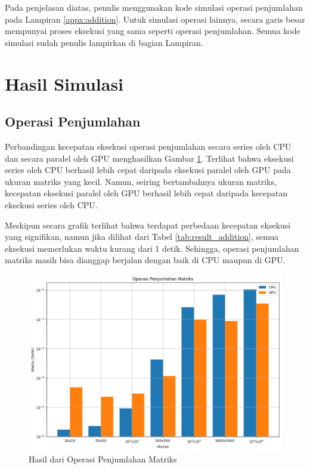 Pada penjelasan diatas, penulis menggunakan kode simulasi operasi penjumlahan pada Lampiran \ref{appx:addition}. Untuk simulasi operasi lainnya, secara garis besar mempunyai proses eksekusi yang sama seperti operasi penjumlahan. Semua kode simulasi sudah penulis lampirkan di bagian Lampiran.

\section{Hasil Simulasi}

\subsection{Operasi Penjumlahan}

Perbandingan kecepatan eksekusi operasi penjumlahan secara series oleh CPU dan secara paralel oleh GPU menghasilkan Gambar \ref{img:result_addition}. Terlihat bahwa eksekusi series oleh CPU berhasil lebih cepat daripada eksekusi paralel oleh GPU pada ukuran matriks yang kecil. Namun, seiring bertambahnya ukuran matriks, kecepatan eksekusi paralel oleh GPU berhasil lebih cepat daripada kecepatan eksekusi series oleh CPU.

Meskipun secara grafik terlihat bahwa terdapat perbedaan kecepatan eksekusi yang signifikan, namun jika dilihat dari Tabel \ref{tab:result_addition}, semua eksekusi memerlukan waktu kurang dari 1 detik. Sehingga, operasi penjumlahan matriks masih bisa dianggap berjalan dengan baik di CPU maupun di GPU.

\begin{figure}[H]
	\centering
	\includegraphics[width=14cm, scale=1]{images/penelitian/addition.png}
	\caption{Hasil dari Operasi Penjumlahan Matriks}
	\label{img:result_addition}
\end{figure}

